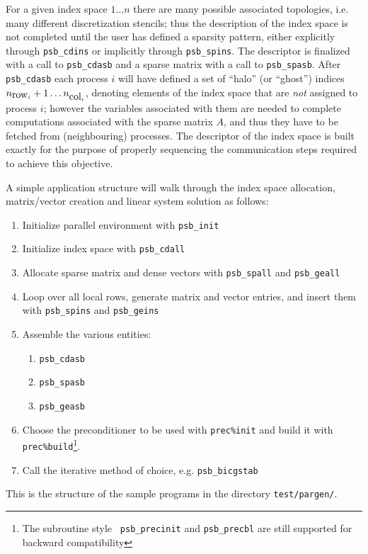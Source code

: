 For  a given index space $1\dots n$ there are many possible associated
topologies, i.e. many different discretization stencils; thus the
description of the index space is not completed until the user has
defined a sparsity pattern, either explicitly through \verb|psb_cdins|
or implicitly through \verb|psb_spins|. The descriptor is finalized
with a call to \verb|psb_cdasb| and a sparse matrix with a call to
\verb|psb_spasb|. After \verb|psb_cdasb| each process $i$ will have
defined a set of ``halo'' (or ``ghost'') indices
$n_{\hbox{row}_i}+1\dots n_{\hbox{col}_i}$, denoting elements of the index
space that are \emph{not} assigned to process $i$; however the
variables associated with them are needed to complete computations
associated with the sparse matrix $A$, and thus they have to be
fetched from (neighbouring) processes. The descriptor of the index
space is built exactly for the purpose of properly sequencing the
communication steps required to achieve this objective. 

A simple application structure will walk through the index space
allocation, matrix/vector creation and linear system solution as
follows:
\begin{enumerate}
\item Initialize parallel environment with \verb|psb_init|
\item Initialize index space with \verb|psb_cdall|
\item Allocate sparse matrix and dense vectors with \verb|psb_spall|
  and \verb|psb_geall|
\item Loop over all local rows, generate matrix and vector entries,
  and insert them with \verb|psb_spins| and \verb|psb_geins|
\item Assemble the various entities: 
\begin{enumerate}
\item \verb|psb_cdasb|
\item \verb|psb_spasb|
\item \verb|psb_geasb|
\end{enumerate}
\item Choose the preconditioner to be used with \verb|prec%init| and
  build it with \verb|prec%build|\footnote{The subroutine style {\tt
      psb\_precinit} and {\tt psb\_precbl} are still supported for
    backward compatibility}. 
\item Call the iterative method of choice, e.g. \verb|psb_bicgstab|
\end{enumerate}
This is the structure of the sample programs in the directory 
\verb|test/pargen/|. 

